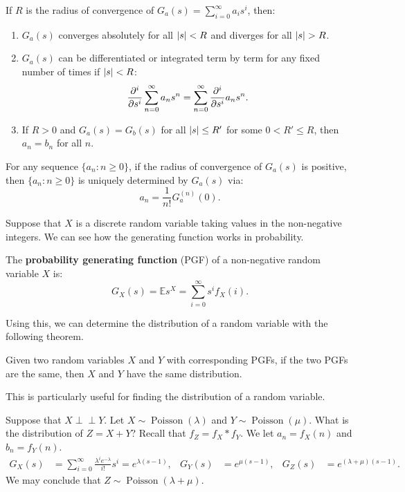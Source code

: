 \documentclass{huhtakm-template-book-v2}
\newcommand{\independent}{\perp\!\!\!\perp}
\newcommand{\expect}{\mathbb{E}}
\DeclareMathOperator{\Poisson}{Poisson}
\begin{document}
    \begin{thm}
        If $R$ is the radius of convergence of $G_{a}(s) = \sum_{i = 0}^{\infty}a_{i}s^{i}$, then:
        \begin{enumerate}
            \item $G_{a}(s)$ converges absolutely for all $\left|{s}\right| < R$ and diverges for all $\left|{s}\right| > R$.
            \item $G_{a}(s)$ can be differentiated or integrated term by term for any fixed number of times if $\left|{s}\right| < R$:
            \begin{equation*}
                \pdv*[order = {i}]{\sum_{n = 0}^{\infty}a_{n}s^{n}}{s} = \sum_{n = 0}^{\infty}\pdv*[order = {i}]{a_{n}s^{n}}{s}.
            \end{equation*}
            \item If $R > 0$ and $G_{a}(s) = G_{b}(s)$ for all $\left|{s}\right| \leq R'$ for some $0 < R' \leq R$, then $a_{n} = b_{n}$ for all $n$.
        \end{enumerate}
    \end{thm}
    \begin{rem}
        For any sequence $\{a_{n}:n \geq 0\}$, if the radius of convergence of $G_{a}(s)$ is positive, then $\{a_{n}:n \geq 0\}$ is uniquely determined by $G_{a}(s)$ via:
        \begin{equation*}
            a_{n} = \frac{1}{n!}G_{a}^{(n)}(0).
        \end{equation*}
    \end{rem}
    Suppose that $X$ is a discrete random variable taking values in the non-negative integers. We can see how the generating function works in probability.
    \begin{defn}
        The \textbf{probability generating function} (PGF) of a non-negative random variable $X$ is:
        \begin{equation*}
            G_{X}(s) = \expect{s^{X}} = \sum_{i = 0}^{\infty}s^{i}f_{X}(i).
        \end{equation*}
    \end{defn}
    Using this, we can determine the distribution of a random variable with the following theorem.
    \begin{thm}
        Given two random variables $X$ and $Y$ with corresponding PGFs, if the two PGFs are the same, then $X$ and $Y$ have the same distribution.
    \end{thm}
    This is particularly useful for finding the distribution of a random variable.
    \begin{eg}
        Suppose that $X \independent Y$. Let $X \sim \Poisson(\lambda)$ and $Y \sim \Poisson(\mu)$. What is the distribution of $Z = X+Y$? Recall that $f_{Z} = f_{X}*f_{Y}$. We let $a_{n} = f_{X}(n)$ and $b_{n} = f_{Y}(n)$.
        \begin{align*}
            G_{X}(s) &= \sum_{i = 0}^{\infty}\frac{\lambda^{i}e^{-\lambda}}{i!}s^{i} = e^{\lambda(s-1)}, & G_{Y}(s) &= e^{\mu(s-1)}, & G_{Z}(s) &= e^{(\lambda+\mu)(s-1)}.
        \end{align*}
        We may conclude that $Z \sim \Poisson(\lambda+\mu)$.
    \end{eg}
    \newpage
\end{document}
